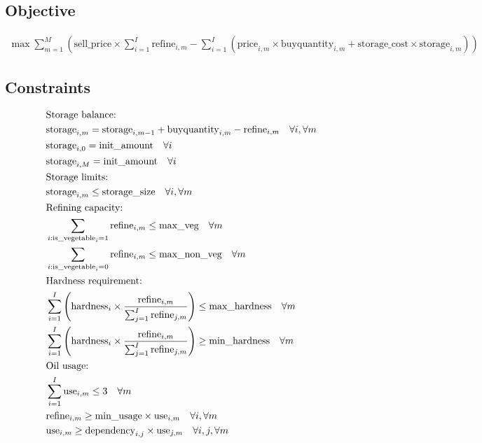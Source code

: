 \documentclass{article}
\begin{document}
\subsection*{Objective}
\begin{align*}
    \max \sum_{m=1}^{M} \left( \text{sell\_price} \times \sum_{i=1}^{I} \text{refine}_{i,m} - \sum_{i=1}^{I} \left(\text{price}_{i,m} \times \text{buyquantity}_{i,m} + \text{storage\_cost} \times \text{storage}_{i,m} \right) \right)
\end{align*}

\subsection*{Constraints}
\begin{align}
    & \text{Storage balance:} \notag \\
    & \text{storage}_{i,m} = \text{storage}_{i,m-1} + \text{buyquantity}_{i,m} - \text{refine}_{i,m} \quad \forall i, \forall m \\
    & \text{storage}_{i,0} = \text{init\_amount} \quad \forall i \\
    & \text{storage}_{i,M} = \text{init\_amount} \quad \forall i \\
    & \text{Storage limits:} \notag \\
    & \text{storage}_{i,m} \leq \text{storage\_size} \quad \forall i, \forall m \\
    & \text{Refining capacity:} \notag \\
    & \sum_{i: \text{is\_vegetable}_i = 1} \text{refine}_{i,m} \leq \text{max\_veg} \quad \forall m \\
    & \sum_{i: \text{is\_vegetable}_i = 0} \text{refine}_{i,m} \leq \text{max\_non\_veg} \quad \forall m \\
    & \text{Hardness requirement:} \notag \\
    & \sum_{i=1}^{I} \left( \text{hardness}_i \times \frac{\text{refine}_{i,m}}{\sum_{j=1}^{I} \text{refine}_{j,m}} \right) \leq \text{max\_hardness} \quad \forall m \\
    & \sum_{i=1}^{I} \left( \text{hardness}_i \times \frac{\text{refine}_{i,m}}{\sum_{j=1}^{I} \text{refine}_{j,m}} \right) \geq \text{min\_hardness} \quad \forall m \\
    & \text{Oil usage:} \notag \\
    & \sum_{i=1}^{I} \text{use}_{i,m} \leq 3 \quad \forall m \\
    & \text{refine}_{i,m} \geq \text{min\_usage} \times \text{use}_{i,m} \quad \forall i, \forall m \\
    & \text{use}_{i,m} \geq \text{dependency}_{i,j} \times \text{use}_{j,m} \quad \forall i, j, \forall m \\
\end{align}
\end{document}

